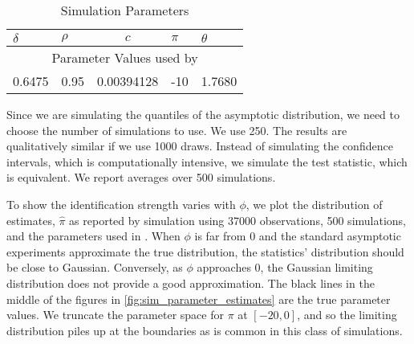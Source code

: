 \documentclass[11pt, letterpaper, twoside]{article}
\begin{document}
\begin{table}[htb]
 
 \centering
 \caption{Simulation Parameters}
 \label{tbl:simulationParameters}
 
 \begin{tabularx}{.65\textwidth}{X X c X X}

  \toprule
  $\delta$ & $\rho$ & $c$ & $\pi$ & $\theta$ \\
  \midrule
  \multicolumn{5}{c}{Parameter Values used by \textcite{han2018leverage}} \\
  \midrule
  0.6475  & 0.95  & \num[scientific-notation=true]{.00394128} & -10 & 1.7680 \\
  \bottomrule
%
 \end{tabularx}

\end{table}


Since we are simulating the quantiles of the asymptotic distribution, we need to choose the number of simulations to use. We use \num{250}. The results are qualitatively similar if we use \num{1000} draws. Instead of simulating the confidence intervals, which is computationally intensive, we simulate the test statistic, which is equivalent.   We report averages over \num{500} simulations.

To show the identification strength varies with $\phi$, we plot the distribution of estimates, $\widehat{\pi}$ as reported by simulation using \num{37000} observations, \num{500} simulations, and the parameters used in \textcite{han2018leverage}. When $\phi$ is far from $0$ and the standard asymptotic experiments approximate the true distribution, the statistics' distribution should be close to Gaussian. Conversely, as $\phi$ approaches $0$, the Gaussian limiting distribution does not provide a good approximation. The black lines in the middle of the figures in \cref{fig:sim_parameter_estimates} are the true parameter values. We truncate the parameter space for $\pi$ at $[-20, 0]$, and so the limiting distribution piles up at the boundaries as is common in this class of simulations.  
\end{document}
